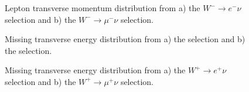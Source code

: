 \begin{figure}[h]
\begin{minipage}[h]{0.49\linewidth}
\end{minipage}
\hfill
\begin{minipage}[h]{0.49\linewidth}
\end{minipage}
\label{ris:WlnuMLepPt}
\caption{Lepton transverse momentum distribution from a) the $W^{-} \to e^{-} \nu$ selection and  b) the $W^{-} \to \mu^{-} \nu$ selection.}
\end{figure}




\begin{figure}[h]
\begin{minipage}[h]{0.49\linewidth}
\end{minipage}
\hfill
\begin{minipage}[h]{0.49\linewidth}
\end{minipage}

\caption{Missing transverse energy distribution from a) the \wenu selection and  b) the \wmunu selection.}
\end{figure}

\begin{figure}[h]
\begin{minipage}[h]{0.49\linewidth}
\end{minipage}
\hfill
\begin{minipage}[h]{0.49\linewidth}
\end{minipage}

\caption{Missing transverse energy distribution from  a) the $W^{+} \to e^{+} \nu$ selection and  b) the $W^{+} \to \mu^{+} \nu$ selection.}
\end{figure}

